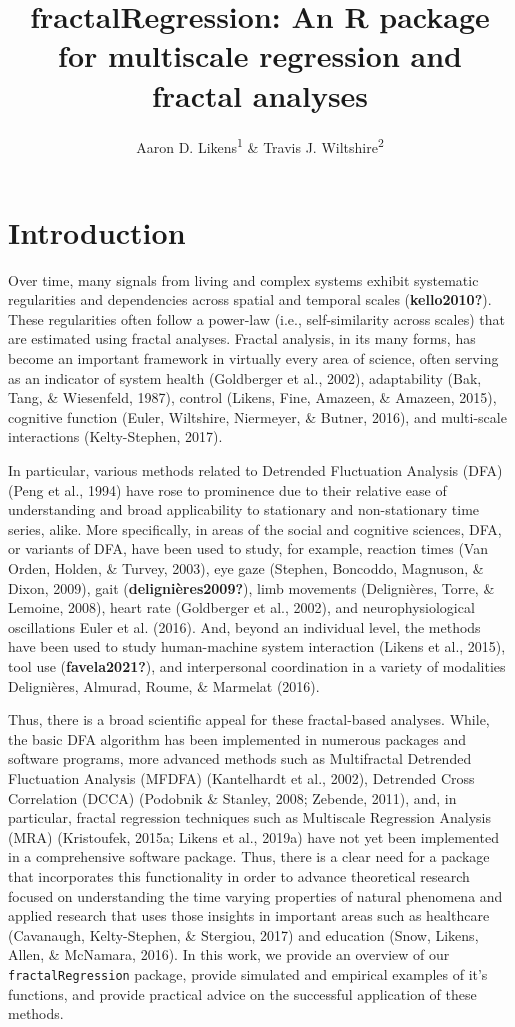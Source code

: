 \documentclass[
  man]{apa6}
\title{fractalRegression: An R package for multiscale regression and fractal analyses}
\author{Aaron D. Likens\textsuperscript{1} \& Travis J. Wiltshire\textsuperscript{2}}
\date{}
\affiliation{\vspace{0.5cm}\textsuperscript{1} Department of Biomechanics, University of Nebraska at Omaha\\\textsuperscript{2} Department of Cognitive Science \& Artificial Intelligence, Tilburg University}
\begin{document}
\maketitle

\hypertarget{introduction}{%
\section{Introduction}\label{introduction}}

Over time, many signals from living and complex systems exhibit
systematic regularities and dependencies across spatial and temporal
scales (\textbf{kello2010?}). These regularities often follow a power-law (i.e.,
self-similarity across scales) that are estimated using fractal
analyses. Fractal analysis, in its many forms, has become an important
framework in virtually every area of science, often serving as an
indicator of system health (Goldberger et al., 2002),
adaptability (Bak, Tang, \& Wiesenfeld, 1987), control
(Likens, Fine, Amazeen, \& Amazeen, 2015), cognitive function
(Euler, Wiltshire, Niermeyer, \& Butner, 2016), and multi-scale interactions
(Kelty-Stephen, 2017).

In particular, various methods related to Detrended Fluctuation Analysis
(DFA) (Peng et al., 1994) have rose to prominence due to
their relative ease of understanding and broad applicability to
stationary and non-stationary time series, alike. More specifically, in
areas of the social and cognitive sciences, DFA, or variants of DFA,
have been used to study, for example, reaction times
(Van Orden, Holden, \& Turvey, 2003), eye gaze
(Stephen, Boncoddo, Magnuson, \& Dixon, 2009), gait
(\textbf{delignières2009?}), limb movements
(Delignières, Torre, \& Lemoine, 2008), heart rate
(Goldberger et al., 2002), and neurophysiological
oscillations Euler et al. (2016). And, beyond an individual level,
the methods have been used to study human-machine system interaction
(Likens et al., 2015), tool use
(\textbf{favela2021?}), and
interpersonal coordination in a variety of modalities
Delignières, Almurad, Roume, \& Marmelat (2016).

Thus, there is a broad scientific appeal for these fractal-based
analyses. While, the basic DFA algorithm has been implemented in
numerous packages and software programs, more advanced methods such as
Multifractal Detrended Fluctuation Analysis (MFDFA)
(Kantelhardt et al., 2002), Detrended Cross
Correlation (DCCA) (Podobnik \& Stanley, 2008; Zebende, 2011), and, in particular,
fractal regression techniques such as Multiscale Regression Analysis
(MRA) (Kristoufek, 2015a; Likens et al., 2019a) have not yet been
implemented in a comprehensive software package. Thus, there is a clear
need for a package that incorporates this functionality in order to
advance theoretical research focused on understanding the time varying
properties of natural phenomena and applied research that uses those
insights in important areas such as healthcare (Cavanaugh, Kelty-Stephen, \& Stergiou, 2017) and
education (Snow, Likens, Allen, \& McNamara, 2016). In this work, we provide an overview of our
\texttt{fractalRegression} package, provide simulated and empirical examples of
it's functions, and provide practical advice on the successful
application of these methods.
\end{document}
